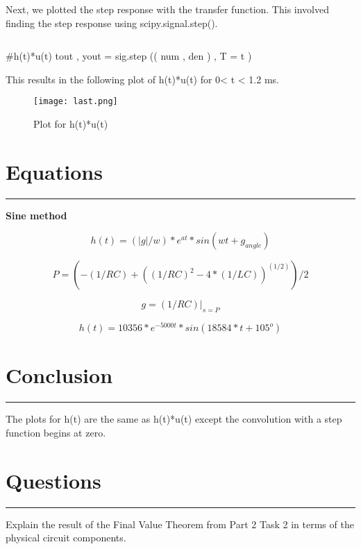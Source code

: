 \documentclass[12pt]{report}
\begin{document}
Next, we plotted the step response with the transfer function. This involved finding the step response using scipy.signal.step().

 \begin{lstlisting}[language=Python, caption=Python function to convert to t domain]

\end{lstlisting}
#h(t)*u(t) 
tout , yout = sig.step (( num , den ) , T = t )

\vspace{1cm}
This results in the following plot of h(t)*u(t) for 0< t < 1.2 ms.

\begin{figure}[htp]
    \centering
    \texttt{[image: last.png]}
    \caption{Plot for h(t)*u(t)}
    \label{fig:ghj}
\end{figure}
\section*{Equations}
\hrule
\vspace{1cm}
\setlength{\parindent}{5ex}

\begin{center}
    \textbf{Sine method}
\end{center}

$$h(t) = (|g|/w)*{e^{at}}*sin(wt+{g_{angle}})$$

$$ P = (-(1/RC)+((1/RC)^{2}-4*(1/LC))^(1/2))/2$$

$$g = (1/RC)|_{s=P}$$

$$h(t) = 10356*e^{-5000t}*sin(18584*t + 105^{o})$$

 \newpage

\section*{Conclusion}
\hrule
\vspace{1cm}
\setlength{\parindent}{5ex}
The plots for h(t) are the same as h(t)*u(t) except the convolution with a step function begins at zero. 


\section*{Questions}
\hrule
\vspace{1cm}
\setlength{\parindent}{5ex}
Explain the result of the Final Value Theorem from Part 2 Task 2 in terms of the physical circuit components.
\end{document}
